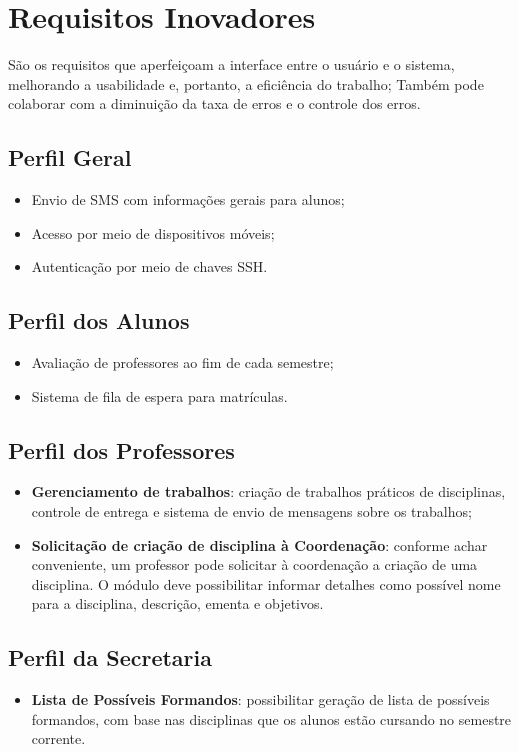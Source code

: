 \documentclass{book}
\begin{document}


\section{Requisitos Inovadores}
São os requisitos que aperfeiçoam a interface entre o usuário e o sistema, melhorando a usabilidade e, portanto, a eficiência do trabalho; Também pode colaborar com a diminuição da taxa de erros e o controle dos erros.

\subsection{Perfil Geral}

\begin{itemize}
	\item Envio de SMS com informações gerais para alunos;
	\item Acesso por meio de dispositivos móveis;
	\item Autenticação por meio de chaves SSH.
\end{itemize}



\subsection{Perfil dos Alunos}

\begin{itemize}
	\item Avaliação de professores ao fim de cada semestre;
	\item Sistema de fila de espera para matrículas.
\end{itemize}


\subsection{Perfil dos Professores}

\begin{itemize}
	\item \textbf{Gerenciamento de trabalhos}: criação de trabalhos práticos de disciplinas, controle de entrega e sistema de envio de mensagens sobre os trabalhos;
	\item \textbf{Solicitação de criação de disciplina à Coordenação}: conforme achar conveniente, um professor pode solicitar à coordenação a criação de uma
	disciplina. O módulo deve possibilitar informar detalhes como possível nome para a disciplina, descrição, ementa e objetivos.
\end{itemize}



\subsection{Perfil da Secretaria}

\begin{itemize}
	\item \textbf{Lista de Possíveis Formandos}: possibilitar geração de lista de possíveis formandos, com base nas disciplinas que os alunos estão cursando no semestre corrente.
\end{itemize}





\printindex
\end{document}
